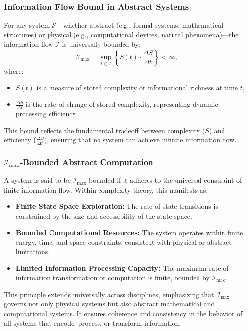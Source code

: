 \documentclass[12pt]{article}
\begin{document}
\subsubsection{Information Flow Bound in Abstract Systems}
For any system \(\mathcal{S}\)—whether abstract (e.g., formal systems, mathematical structures) or physical (e.g., computational devices, natural phenomena)—the information flow \(\mathcal{I}\) is universally bounded by:
\[
\mathcal{I}_{\text{max}} = \sup_{t \in T} \left\{S(t) \cdot \frac{\Delta S}{\Delta t}\right\} < \infty,
\]
where:
\begin{itemize}
    \item \(S(t)\) is a measure of stored complexity or informational richness at time \(t\),
    \item \(\frac{\Delta S}{\Delta t}\) is the rate of change of stored complexity, representing dynamic processing efficiency.
\end{itemize}
This bound reflects the fundamental tradeoff between complexity (\(S\)) and efficiency (\(\frac{\Delta S}{\Delta t}\)), ensuring that no system can achieve infinite information flow.

\subsubsection{\(\mathcal{I}_{\text{max}}\)-Bounded Abstract Computation}
A system is said to be \(\mathcal{I}_{\text{max}}\)-bounded if it adheres to the universal constraint of finite information flow. Within complexity theory, this manifests as:
\begin{itemize}
    \item \textbf{Finite State Space Exploration:} The rate of state transitions is constrained by the size and accessibility of the state space.
    \item \textbf{Bounded Computational Resources:} The system operates within finite energy, time, and space constraints, consistent with physical or abstract limitations.
    \item \textbf{Limited Information Processing Capacity:} The maximum rate of information transformation or computation is finite, bounded by \(\mathcal{I}_{\text{max}}\).
\end{itemize}

This principle extends universally across disciplines, emphasizing that \(\mathcal{I}_{\text{max}}\) governs not only physical systems but also abstract mathematical and computational systems. It ensures coherence and consistency in the behavior of all systems that encode, process, or transform information.
\end{document}
